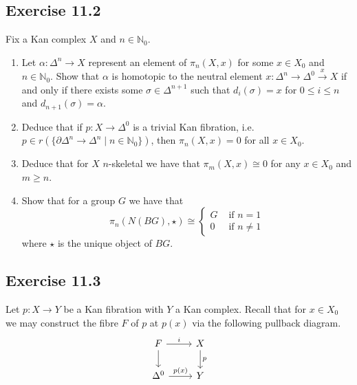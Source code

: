 \subsection{Exercise 11.2}

Fix a Kan complex $ X $ and $ n \in \mathbb{N}_0$.

\begin{enumerate}[label=(\alph*)]
    \item 
    Let $ \alpha: \Delta^n \to X $ represent an element of $ \pi_n ( X , x ) $ for some $ x \in X_0 $ and $ n \in \mathbb{N}_0 $.
    Show that $ \alpha $ is homotopic to the neutral element $ x : \Delta^n \to \Delta^0 \xrightarrow{x} X $ if and only if there exists some $ \sigma \in \Delta^{n+1}$ such that $ d_i ( \sigma ) = x $ for $ 0 \leq  i \leq n $ and $ d_{n+1} ( \sigma ) = \alpha $.

    \item 
    Deduce that if $ p : X \to \Delta^0 $ is a trivial Kan fibration, i.e. $p \in r ( \{ \partial \Delta^n \to \Delta^n \mid n \in \mathbb{N}_0 \} )$, then $ \pi_n( X , x ) = 0 $ for all $ x \in X_0 $.

    \item 
    Deduce that for $X$ $n$-skeletal we have that $\pi_m ( X , x ) \cong 0 $ for any $ x \in X_0 $ and $ m \geq n $.

    \item 
    Show that for a group $ G $ we have that 
    \[
        \pi_n ( N ( BG ) , \star ) 
        \cong 
        \begin{cases}
            G &\text{ if }  n = 1
            \\
            0 &\text{ if }  n \neq 1
        \end{cases}
    \]
    where $ \star $ is the unique object of $ BG $.
\end{enumerate}

\subsection{ Exercise 11.3 }

Let $p: X  \to Y$ be a Kan fibration with $ Y $ a Kan complex. 
Recall that for $ x \in X_0 $ we may construct the fibre $ F $ of $ p $ at $ p ( x ) $ via the following pullback diagram.
\[
\begin{tikzcd}
    F 
    \ar[r, "i"]
    \dar
    &
    X
    \ar[d,"p"]
    \\
    \Delta^0
    \ar[r,"p(x)"]
    &
    Y
\end{tikzcd}
\]

